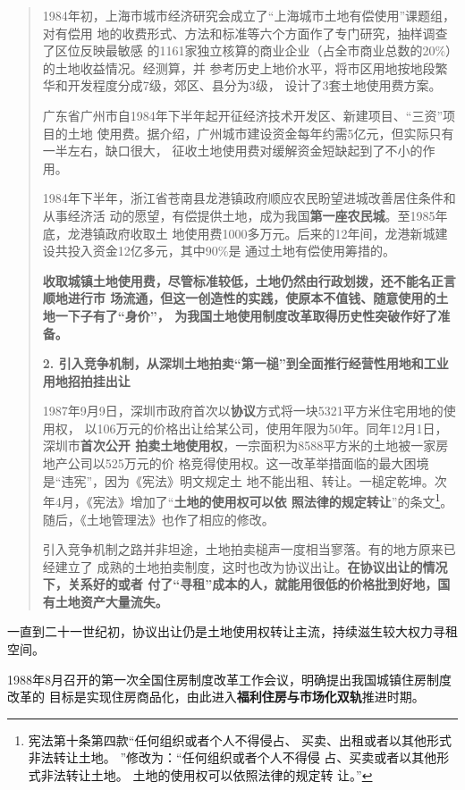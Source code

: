 \begin{quotation}
  1984年初，上海市城市经济研究会成立了“上海城市土地有偿使用”课题组，对有偿用
  地的收费形式、方法和标准等六个方面作了专门研究，抽样调查了区位反映最敏感
  的1161家独立核算的商业企业（占全市商业总数的20\%）的土地收益情况。经测算，并
  参考历史上地价水平，将市区用地按地段繁华和开发程度分成7级，郊区、县分为3级，
  设计了3套土地使用费方案。

  广东省广州市自1984年下半年起开征经济技术开发区、新建项目、“三资”项目的土地
  使用费。据介绍，广州城市建设资金每年约需5亿元，但实际只有一半左右，缺口很大，
  征收土地使用费对缓解资金短缺起到了不小的作用。

  1984年下半年，浙江省苍南县龙港镇政府顺应农民盼望进城改善居住条件和从事经济活
  动的愿望，有偿提供土地，成为我国\textbf{第一座农民城}。至1985年底，龙港镇政府收取土
  地使用费1000多万元。后来的12年间，龙港新城建设共投入资金12亿多元，其中90\%是
  通过土地有偿使用筹措的。

  \textbf{收取城镇土地使用费，尽管标准较低，土地仍然由行政划拨，还不能名正言顺地进行市
    场流通，但这一创造性的实践，使原本不值钱、随意使用的土地一下子有了“身价”，
    为我国土地使用制度改革取得历史性突破作好了准备。}

  \textbf{2. 引入竞争机制，从深圳土地拍卖“第一槌”到全面推行经营性用地和工业用地招拍挂出让}

  1987年9月9日，深圳市政府首次以\textbf{协议}方式将一块5321平方米住宅用地的使用权，
  以106万元的价格出让给某公司，使用年限为50年。同年12月1日，深圳市\textbf{首次公开
    拍卖土地使用权}，一宗面积为8588平方米的土地被一家房地产公司以525万元的价
  格竞得使用权。这一改革举措面临的最大困境是“违宪”，因为《宪法》明文规定土
  地不能出租、转让。一槌定乾坤。次年4月，《宪法》增加了“\textbf{土地的使用权可以依
    照法律的规定转让}”的条文\footnote{宪法第十条第四款“任何组织或者个人不得侵占、
    买卖、出租或者以其他形式非法转让土地。 ”修改为：“任何组织或者个人不得侵
    占、买卖或者以其他形式非法转让土地。 土地的使用权可以依照法律的规定转
    让。”}。随后，《土地管理法》也作了相应的修改。


  引入竞争机制之路并非坦途，土地拍卖槌声一度相当寥落。有的地方原来已经建立了
  成熟的土地拍卖制度，这时也改为协议出让。\textbf{在协议出让的情况下，关系好的或者
    付了“寻租”成本的人，就能用很低的价格批到好地，国有土地资产大量流失。}
\end{quotation}

一直到二十一世纪初，协议出让仍是土地使用权转让主流，持续滋生较大权力寻租空间。

1988年8月召开的第一次全国住房制度改革工作会议，明确提出我国城镇住房制度改革的
目标是实现住房商品化，由此进入\textbf{福利住房与市场化双轨}推进时期。

